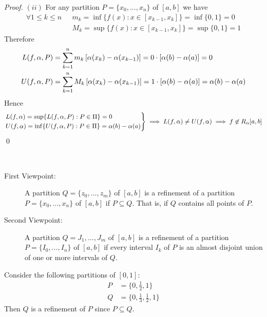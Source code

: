 \begin{proof}
$(ii)$ For any partition $P=\{x_0, ..., x_n\}$ of $[a,b]$ we have
    \begin{align*}
        \forall 1 \leq k \leq n ~~~&m_k = \inf \{f(x) : x\in [x_{k-1}, x_k]\} = \inf \{0,1\} = 0 \\ 
        &M_k = \sup \{f(x) : x \in [x_{k-1}, x_k]\} = \sup \{0,1\} = 1
    \end{align*}
    Therefore
    \begin{align*}
        L(f, \alpha, P) &= \sum_{k=1}^{n}m_k \left[\alpha(x_{k})-\alpha(x_{k-1})\right] = 0 \cdot \left[\alpha(b) - \alpha(a)\right] = 0 \\
        U(f, \alpha, P) &= \sum_{k=1}^{n}M_k \left[\alpha(x_{k})-\alpha(x_{k-1})\right] = 1 \cdot \left[\alpha(b) - \alpha(a)\right] = \alpha(b) - \alpha(a)
    \end{align*}
    Hence
    $$
    \begin{rcases*}
        L(f, \alpha) = \sup \{L(f, \alpha, P) : P \in \Pi\} = 0 \\
        U(f, \alpha) = \inf \{U(f, \alpha, P) : P \in \Pi\} = \alpha(b) - \alpha(a)
    \end{rcases*} \implies L(f, \alpha) \not = U(f, \alpha) \implies f \not \in R_{\alpha}[a,b]
    $$
    \qed
\end{proof}

\begin{definition} \leavevmode\\
    \begin{description}
        \item[First Viewpoint: ] A partition $Q = \{z_0, ..., z_m\}$ of $[a,b]$ is a refinement of a partition $P=\{x_0, ..., x_n\}$ of $[a,b]$ if $P \subseteq Q$. That is, if $Q$ contains all points of $P$.
        \item[Second Viewpoint: ] A partition $Q={J_1, ..., J_m}$ of $[a,b]$ is a refinement of a partition $P=\{I_0, ..., I_n\}$ of $[a,b]$ if every interval $I_k$ of $P$ is an almost disjoint union of one or more intervals of $Q$.  
    \end{description}
\end{definition}

\begin{example}
    Consider the following partitions of $[0,1]$:
    \begin{align*}
        P &= \{0, \frac{1}{2}, 1\} \\
        Q &= \{0, \frac{1}{3}, \frac{1}{2}, 1\}
    \end{align*}
    Then $Q$ is a refinement of $P$ since $P \subseteq Q$.
\end{example}

